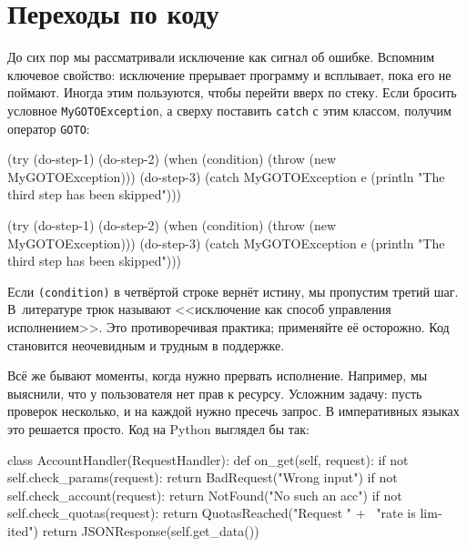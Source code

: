 \section{Переходы по коду}


До сих пор мы рассматривали исключение как сигнал об ошибке. Вспомним ключевое
свойство: исключение прерывает программу и всплывает, пока его не
поймают. Иногда этим пользуются, чтобы перейти вверх по стеку. Если бросить
условное \verb|MyGOTOException|, а сверху поставить \verb|catch| с этим
классом, получим оператор \verb|GOTO|:

\ifx\DEVICETYPE\MOBILE

\begin{english}
  \begin{clojure/lines}
(try
  (do-step-1)
  (do-step-2)
  (when (condition)
    (throw (new MyGOTOException)))
  (do-step-3)
  (catch MyGOTOException e
    (println "The third step
                  has been skipped")))
  \end{clojure/lines}
\end{english}

\else

\begin{english}
  \begin{clojure/lines}
(try
  (do-step-1)
  (do-step-2)
  (when (condition)
    (throw (new MyGOTOException)))
  (do-step-3)
  (catch MyGOTOException e
    (println "The third step has been skipped")))
  \end{clojure/lines}
\end{english}

\fi

Если \verb|(condition)| в четвёртой строке вернёт истину, мы пропустим третий
шаг. В~литературе трюк называют <<исключение как способ управления
исполнением>>. Это противоречивая практика; применяйте её осторожно. Код
становится неочевидным и трудным в поддержке.


Всё же бывают моменты, когда нужно прервать исполнение. Например, мы
выяснили, что у пользователя нет прав к ресурсу. Усложним задачу: пусть проверок
несколько, и на каждой нужно пресечь запрос. В императивных языках это решается
просто. Код на Python выглядел бы так:


\ifx\DEVICETYPE\MOBILE

\begin{english}
  \begin{python}
class AccountHandler(RequestHandler):
  def on_get(self, request):
    if not self.check_params(request):
      return BadRequest("Wrong input")
    if not self.check_account(request):
      return NotFound("No such an acc")
    if not self.check_quotas(request):
      return QuotasReached("Request " + \
             "rate is limited")
    return JSONResponse(self.get_data())
  \end{python}
\end{english}


